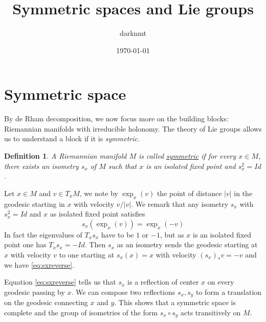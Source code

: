 \documentclass[11pt]{article}
\author{darknmt}
\date{\today}
\title{Symmetric spaces and Lie groups}
\newtheorem{definition}{Definition}
\begin{document}
\maketitle
\tableofcontents

\iffalse
\begin{info}
The PDF version of this page can be downloaded by replacing \texttt{html} in the its address by
\texttt{pdf}. 
For example \texttt{/html/sheaf-cohomology.html} should become \texttt{/pdf/sheaf-cohomology.pdf}.
\end{info}
\fi

\iffalse
\begin{info}
This post is a part of the \href{../res/Stage2017.pdf}{memoire of my M1 internship} at I2M. The memoire contains,
needless to say, less errors than this page.
\end{info}
\fi

\section{Symmetric space}
\label{sec:orgf40c825}
By de Rham decomposition, we now focus more on the building blocks: Riemannian manifolds with irreducible
holonomy. The theory of Lie groups allows us to understand a block if it is \emph{symmetric}.


\begin{definition}
A Riemannian manifold \(M\) is called \uline{symmetric} if for every \(x\in M\), there exists an isometry
\(s_x\) of \(M\) such that \(x\) is an isolated fixed point and \(s_x^2=Id\).
\end{definition}


Let \(x\in M\) and \(v\in T_xM\), we note by \(\exp_x(v)\) the point of distance \(|v|\) in the geodesic
starting in \(x\) with velocity \(v/|v|\). We remark that any isometry \(s_x\) with \(s_x^2=Id\) and \(x\) as isolated fixed
point satisfies 
\begin{equation}
  \label{eq:sxreverse}
s_x(\exp_x(v)) = \exp_x(-v)
\end{equation}
In fact the eigenvalues of \(T_xs_x\) have to be \(1\) or \(-1\), but as \(x\) is an isolated fixed point
one has \(T_xs_x = -Id\). Then \(s_x\) as an isometry sends the geodesic starting at \(x\) with velocity
\(v\) to one starting at \(s_x(x)=x\) with velocity \((s_x)_* v = -v\) and we have \eqref{eq:sxreverse}.


Equation \eqref{eq:sxreverse} tells us that \(s_x\) is a reflection of center \(x\) on every geodesic
passing by \(x\). We can compose two reflections \(s_x,s_y\) to form a translation on the geodesic
connecting \(x\) and \(y\). This shows that a symmetric space is complete and the group of isometries
of the form \(s_x\circ s_y\) acts transitively on \(M\).
\end{document}
